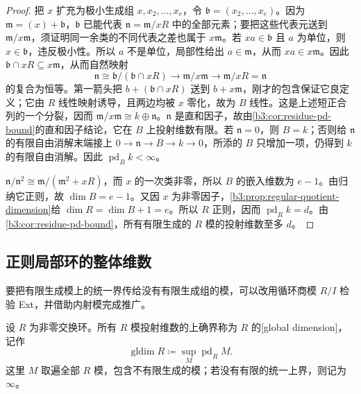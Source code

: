 \begin{proof}
	把 \(x\) 扩充为极小生成组 \(x,x_2,\ldots,x_e\)，令 \(\mathfrak b=(x_2,\ldots,x_e)\)。因为 \(\mathfrak m=(x)+\mathfrak b\)，\(\mathfrak b\) 已能代表 \(\mathfrak n=\mathfrak m/xR\) 中的全部元素；要把这些代表元送到 \(\mathfrak m/x\mathfrak m\)，须证明同一余类的不同代表之差也属于 \(x\mathfrak m\)。若 \(xa\in\mathfrak b\) 且 \(a\) 为单位，则 \(x\in\mathfrak b\)，违反极小性。所以 \(a\) 不是单位，局部性给出 \(a\in\mathfrak m\)，从而 \(xa\in x\mathfrak m\)。因此 \(\mathfrak b\cap xR\subseteq x\mathfrak m\)，从而自然映射
	\[
		\mathfrak n\cong\mathfrak b/(\mathfrak b\cap xR) \longrightarrow\mathfrak m/x\mathfrak m \longrightarrow\mathfrak m/xR=\mathfrak n
	\]
	的复合为恒等。第一箭头把 \(b+(\mathfrak b\cap xR)\) 送到 \(b+x\mathfrak m\)，刚才的包含保证它良定义；它由 \(R\) 线性映射诱导，且两边均被 \(x\) 零化，故为 \(B\) 线性。这是上述短正合列的一个分裂，因而 \(\mathfrak m/x\mathfrak m\cong k\oplus\mathfrak n\)。\(\mathfrak n\) 是直和因子，故由\cref{b3:cor:residue-pd-bound}的直和因子结论，它在 \(B\) 上投射维数有限。若 \(\mathfrak n=0\)，则 \(B=k\)；否则给 \(\mathfrak n\) 的有限自由消解末端接上 \(0\to\mathfrak n\to B\to k\to0\)，所添的 \(B\) 只增加一项，仍得到 \(k\) 的有限自由消解。因此 \(\operatorname{pd}_Bk<\infty\)。

	\(\mathfrak n/\mathfrak n^2\cong\mathfrak m/(\mathfrak m^2+xR)\)，而 \(x\) 的一次类非零，所以 \(B\) 的嵌入维数为 \(e-1\)。由归纳它正则，故 \(\dim B=e-1\)。又因 \(x\) 为非零因子，\cref{b3:prop:regular-quotient-dimension}给 \(\dim R=\dim B+1=e\)。所以 \(R\) 正则，因而 \(\operatorname{pd}_Rk=d\)。由\cref{b3:cor:residue-pd-bound}，所有有限生成的 \(R\) 模的投射维数至多 \(d\)。
\end{proof}

\subsection{正则局部环的整体维数}
\label{b3:subsec:1802:03}

要把有限生成模上的统一界传给没有有限生成组的模，可以改用循环商模 \(R/I\) 检验 Ext，并借助内射模完成推广。

\begin{definition}\label{b3:def:global-dimension}
	设 \(R\) 为非零交换环。所有 \(R\) 模投射维数的上确界称为 \(R\) 的[global dimension]，记作
	\[
		\operatorname{gldim}R\coloneqq\sup_M\operatorname{pd}_RM.
	\]
	这里 \(M\) 取遍全部 \(R\) 模，包含不有限生成的模；若没有有限的统一上界，则记为 \(\infty\)。
\end{definition}

